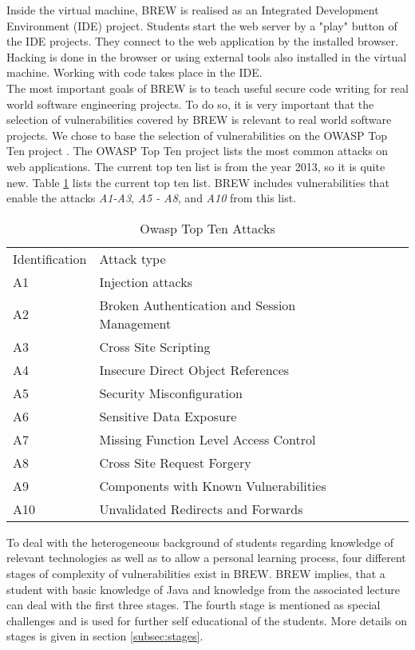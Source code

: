 \documentclass{llncs}
\begin{document}
Inside the virtual machine, BREW is realised as an Integrated Development Environment (IDE) project. Students start the web server by a "play" button of the IDE projects. They connect to the web application by the installed browser. Hacking is done in the browser or using external tools also installed in the virtual machine. Working with code takes place in the IDE.\\

The most important goals of BREW is to teach useful secure code writing for real world software engineering projects. To do so, it is very important that the selection of vulnerabilities covered by BREW is relevant to real world software projects. We chose to base the selection of vulnerabilities on the OWASP Top Ten project \cite{owasptopten2013}. The OWASP Top Ten project lists the most common attacks on web applications. The current top ten list is from the year 2013, so it is quite new. Table \ref{tab:owasptopten} lists the current top ten list. BREW includes vulnerabilities that enable the attacks {\em A1-A3}, {\em A5 - A8}, and {\em A10} from this list.

\begin{table}
\centering
\caption{Owasp Top Ten Attacks}
\label{tab:owasptopten}
\begin{tabular}{llllll}
\hline\noalign{\smallskip}
Identification & Attack type\\
\noalign{\smallskip}
\hline
\noalign{\smallskip}
A1 & Injection attacks\\
A2 & Broken Authentication and Session Management\\
A3 & Cross Site Scripting\\
A4 & Insecure Direct Object References\\
A5 & Security Misconfiguration\\
A6 & Sensitive Data Exposure\\
A7 & Missing Function Level Access Control\\
A8 & Cross Site Request Forgery\\
A9 & Components with Known Vulnerabilities\\
A10 & Unvalidated Redirects and Forwards\\
\hline
\end{tabular}
\end{table}


To deal with the heterogeneous background of students regarding knowledge of relevant technologies as well as to allow a personal learning process, four different stages of complexity of vulnerabilities exist in BREW. BREW implies, that a student with basic knowledge of Java and knowledge from the associated lecture can deal with the first three stages. The fourth stage is mentioned as special challenges and is used for further self educational of the students. More details on stages is given in section \ref{subsec:stages}.
\end{document}
